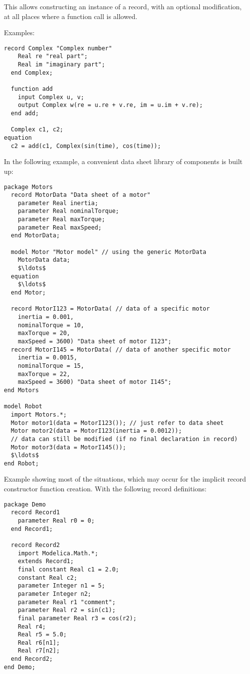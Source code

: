 \begin{nonnormative}
This allows constructing an instance of a record, with an optional modification, at all places where a function call is allowed.

Examples:
\begin{lstlisting}[language=modelica]
  record Complex "Complex number"
    Real re "real part";
    Real im "imaginary part";
  end Complex;

  function add
    input Complex u, v;
    output Complex w(re = u.re + v.re, im = u.im + v.re);
  end add;

  Complex c1, c2;
equation
  c2 = add(c1, Complex(sin(time), cos(time));
\end{lstlisting}

In the following example, a convenient data sheet library of components is built up:
\begin{lstlisting}[language=modelica]
package Motors
  record MotorData "Data sheet of a motor"
    parameter Real inertia;
    parameter Real nominalTorque;
    parameter Real maxTorque;
    parameter Real maxSpeed;
  end MotorData;

  model Motor "Motor model" // using the generic MotorData
    MotorData data;
    $\ldots$
  equation
    $\ldots$
  end Motor;

  record MotorI123 = MotorData( // data of a specific motor
    inertia = 0.001,
    nominalTorque = 10,
    maxTorque = 20,
    maxSpeed = 3600) "Data sheet of motor I123";
  record MotorI145 = MotorData( // data of another specific motor
    inertia = 0.0015,
    nominalTorque = 15,
    maxTorque = 22,
    maxSpeed = 3600) "Data sheet of motor I145";
end Motors

model Robot
  import Motors.*;
  Motor motor1(data = MotorI123()); // just refer to data sheet
  Motor motor2(data = MotorI123(inertia = 0.0012));
  // data can still be modified (if no final declaration in record)
  Motor motor3(data = MotorI145());
  $\ldots$
end Robot;
\end{lstlisting}

Example showing most of the situations, which may occur for the implicit record constructor function creation.
With the following record definitions:
\begin{lstlisting}[language=modelica]
package Demo
  record Record1
    parameter Real r0 = 0;
  end Record1;

  record Record2
    import Modelica.Math.*;
    extends Record1;
    final constant Real c1 = 2.0;
    constant Real c2;
    parameter Integer n1 = 5;
    parameter Integer n2;
    parameter Real r1 "comment";
    parameter Real r2 = sin(c1);
    final parameter Real r3 = cos(r2);
    Real r4;
    Real r5 = 5.0;
    Real r6[n1];
    Real r7[n2];
  end Record2;
end Demo;
\end{lstlisting}


\end{nonnormative}
